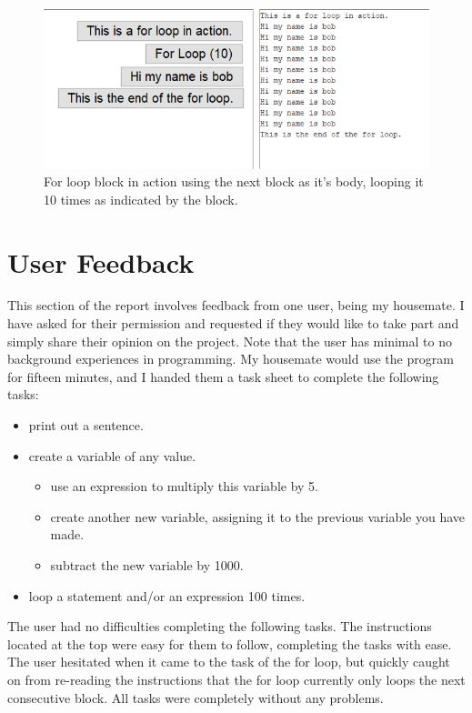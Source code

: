 \documentclass[a4paper, 12pt]{article}
\begin{document}
            \begin{figure}[h]
                \centering
                \includegraphics[width=130mm]{for_loop.png}
                \caption{For loop block in action using the next block as it's body, looping
                it 10 times as indicated by the block.}
            \end{figure}
        
    \clearpage
    \section{User Feedback}
        This section of the report involves feedback from one user, being my housemate. I have asked for
        their permission and requested if they would like to take part and simply share their opinion on
        the project. Note that the user has minimal to no background experiences in programming. My
        housemate would use the program for fifteen minutes, and I handed them a task sheet to complete
        the following tasks:

        \begin{itemize}
            \item print out a sentence.
            \item create a variable of any value.
            \begin{itemize}
                \item use an expression to multiply this variable by 5.
                \item create another new variable, assigning it to the previous variable you have made.
                \item subtract the new variable by 1000.
            \end{itemize}
            \item loop a statement and/or an expression 100 times.
        \end{itemize}

        The user had no difficulties completing the following tasks. The instructions located at the top were
        easy for them to follow, completing the tasks with ease. The user hesitated when it came to the task
        of the for loop, but quickly caught on from re-reading the instructions that the for loop currently
        only loops the next consecutive block. All tasks were completely without any problems. \\
\end{document}
